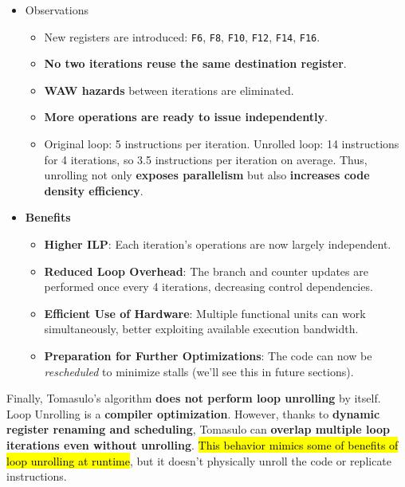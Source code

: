 \begin{itemize}
    \item Observations
    \begin{itemize}
        \item New registers are introduced: \texttt{F6}, \texttt{F8}, \texttt{F10}, \texttt{F12}, \texttt{F14}, \texttt{F16}.
        \item \textbf{No two iterations reuse the same destination register}.
        \item \textbf{WAW hazards} between iterations are eliminated.
        \item \textbf{More operations are ready to issue independently}.
        \item Original loop: 5 instructions per iteration. Unrolled loop: 14 instructions for 4 iterations, so 3.5 instructions per iteration on average. Thus, unrolling not only \textbf{exposes parallelism} but also \textbf{increases code density efficiency}.
    \end{itemize}
    \item[\textcolor{Green3}{\faIcon{check-circle}}] \textcolor{Green3}{\textbf{Benefits}}
    \begin{itemize}[label=\textcolor{Green3}{}]
        \item \textbf{Higher ILP}: Each iteration's operations are now largely independent.
        \item \textbf{Reduced Loop Overhead}: The branch and counter updates are performed once every 4 iterations, decreasing control dependencies.
        \item \textbf{Efficient Use of Hardware}: Multiple functional units can work simultaneously, better exploiting available execution bandwidth.
        \item \textbf{Preparation for Further Optimizations}: The code can now be \emph{rescheduled} to minimize stalls (we'll see this in future sections).
    \end{itemize}
\end{itemize}
Finally, Tomasulo's algorithm \textbf{does not perform loop unrolling} by itself. Loop Unrolling is a \textbf{compiler optimization}. However, thanks to \textbf{dynamic register renaming and scheduling}, Tomasulo can \textbf{overlap multiple loop iterations even without unrolling}. \hl{This behavior mimics some of benefits of loop unrolling at runtime}, but it doesn't physically unroll the code or replicate instructions.

\newpage

